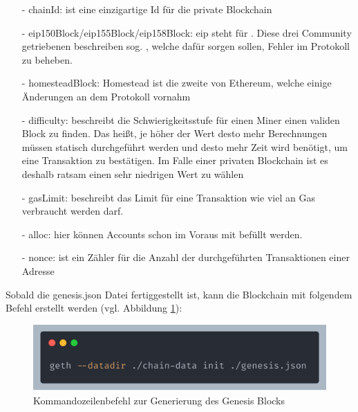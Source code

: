 \begin{itemize}
	\item[-] chainId: ist eine einzigartige Id für die private Blockchain
	      	      	      	      
	\item[-] eip150Block/eip155Block/eip158Block: eip steht für . Diese drei Community getriebenen  beschreiben sog. , welche dafür sorgen sollen, Fehler im Protokoll zu beheben. 
	      	      	      	      
	\item[-] homesteadBlock: Homestead ist die zweite  von Ethereum, welche einige Änderungen an dem Protokoll vornahm
	      	      	      	      	
	\item[-] difficulty: beschreibt die Schwierigkeitsstufe für einen Miner einen validen Block zu finden. Das heißt, je höher der Wert desto mehr Berechnungen müssen statisch durchgeführt werden und desto mehr Zeit wird benötigt, um eine Transaktion zu bestätigen. Im Falle einer privaten Blockchain ist es deshalb ratsam einen sehr niedrigen Wert zu wählen
	      	      	      	      	
	\item[-] gasLimit: beschreibt das Limit für eine Transaktion wie viel an Gas verbraucht werden darf. 
	      	      	      	      
	\item[-] alloc: hier können Accounts schon im Voraus mit  befüllt werden.
	\item[-] nonce: ist ein Zähler für die Anzahl der durchgeführten Transaktionen einer Adresse
\end{itemize}

Sobald die genesis.json Datei fertiggestellt ist, kann die Blockchain mit folgendem Befehl erstellt werden (vgl. Abbildung \ref{img:gethInit}):\\
\begin{figure}[th!]
	\centering
	\includegraphics[width=.9\columnwidth]{./Abbildungen/Kapitel_03/geth-init.png}
	\caption[geth init]{Kommandozeilenbefehl zur Generierung des Genesis Blocks}
	\label{img:gethInit}
\end{figure}

